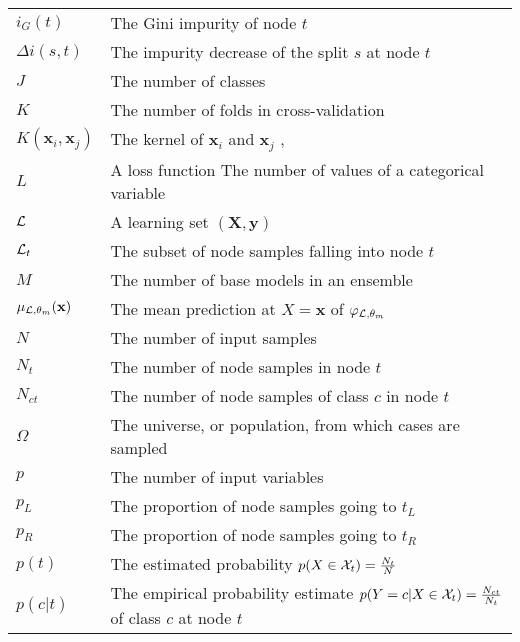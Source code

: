\begin{tabularx}{\textwidth}{ l X }
$i_G(t)$ & The Gini impurity of node $t$ \dotfill  \pageref{eqn:impurity:gini}\\
$\Delta i(s, t)$ & The impurity decrease of the split $s$ at node $t$ \dotfill  \pageref{def:impurity-decrease}\\
$J$ & The number of classes \dotfill  \pageref{ntn:J}\\
$K$ & The number of folds in cross-validation \dotfill  \pageref{ntn:K-cv}\\
$K(\mathbf{x}_i, \mathbf{x}_j)$ & The kernel of $\mathbf{x}_i$ and $\mathbf{x}_j$ \dotfill \pageref{ntn:kernel}, \pageref{ntn:kernel2}\\
$L$ & A loss function \dotfill  \pageref{ntn:L}\newline The number of values of a categorical variable \dotfill \pageref{ntn:L2}\\
${\cal L}$ & A learning set $(\mathbf{X}, \mathbf{y})$ \dotfill  \pageref{ntn:learning-set}\\
${\cal L}_t$ & The subset of node samples falling into node $t$ \dotfill  \pageref{ntn:L_t}\\
$M$ & The number of base models in an ensemble \dotfill  \pageref{ntn:M}\\
$\mu_{{\cal L},\theta_m}(\mathbf{x})$ & The mean prediction at $X = \mathbf{x}$ of $\varphi_{{\cal L},\theta_m}$ \dotfill \pageref{eqn:4:mu} \\
$N$ & The number of input samples \dotfill  \pageref{ntn:N}\\
$N_t$ & The number of node samples in node $t$ \dotfill  \pageref{ntn:N_t}\\
$N_{ct}$ & The number of node samples of class $c$ in node $t$ \dotfill  \pageref{ntn:N_ct}\\
$\Omega$ & The universe, or population, from which cases are sampled \dotfill  \pageref{ntn:omega}\\
$p$ & The number of input variables \dotfill  \pageref{ntn:p}\\
$p_L$ & The proportion of node samples going to $t_L$ \dotfill  \pageref{ntn:p_L}\\
$p_R$ & The proportion of node samples going to $t_R$ \dotfill  \pageref{ntn:p_R}\\
$p(t)$ & The estimated probability $p(X \in {\cal X}_t)=\tfrac{N_t}{N}$ \dotfill  \pageref{ntn:p_t}\\
$p(c|t)$ & The empirical probability estimate $p(Y=c | X \in {\cal X}_t)=\tfrac{N_{ct}}{N_t}$ of class $c$ at node $t$ \dotfill  \pageref{ntn:p_ct}\\

\end{tabularx}

